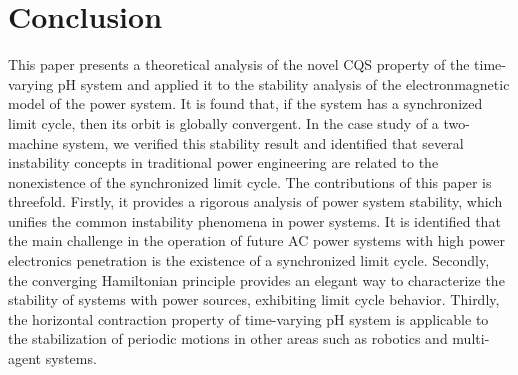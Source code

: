 \section{Conclusion} \label{sec_conclusion}

This paper presents a theoretical analysis of the novel CQS property of the time-varying pH system and applied it to the stability analysis of the electronmagnetic model of the power system. It is found that, if the system has a synchronized limit cycle, then its orbit is globally convergent. In the case study of a two-machine system, we verified this stability result and identified that several instability concepts in traditional power engineering are related to the nonexistence of the synchronized limit cycle. The contributions of this paper is threefold. Firstly, it provides a rigorous analysis of power system stability, which unifies the common instability phenomena in power systems. It is identified that the main challenge in the operation of future AC power systems with high power electronics penetration is the existence of a synchronized limit cycle.
Secondly, the converging Hamiltonian principle provides an elegant way to characterize the stability of systems with power sources, exhibiting limit cycle behavior. 
Thirdly, the horizontal contraction property of time-varying pH system is applicable to the stabilization of periodic motions in other areas such as robotics and multi-agent systems.